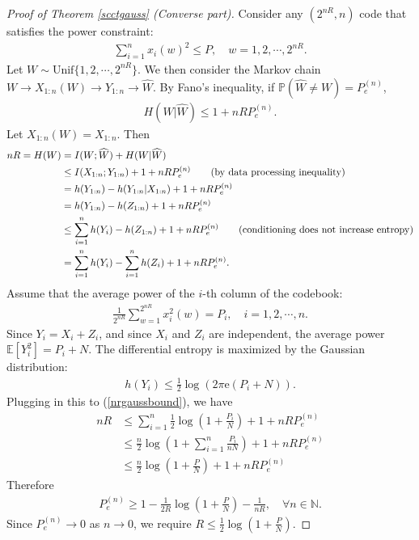 \documentclass{article}
\numberwithin{equation}{section}
\newcommand{\e}{\mathrm{e}}
\newcommand{\E}{\mathbb{E}}
\newcommand{\bbN}{\mathbb{N}}
\newcommand{\bbP}{\mathbb{P}}
\newcommand{\wh}{\widehat}
\theoremstyle{plain}
\theoremstyle{definition}
\begin{document}
\begin{proof}[Proof of Theorem \ref{scctgauss} (Converse part)]
Consider any $(2^{nR},n)$ code that satisfies the power constraint:
\begin{align*}
	\sum_{i=1}^n x_i(w)^2\leq P,\quad w=1,2,\cdots,2^{nR}.
\end{align*}
Let $W\sim\mathrm{Unif}\{1,2,\cdots,2^{nR}\}$. We then consider the Markov chain $W\to X_{1:n}(W)\to Y_{1:n}\to\wh{W}$. By Fano's inequality, if $\bbP(\wh{W}\neq W)=P_e^{(n)}$,
\begin{align*}
	H(W|\wh{W})\leq 1+nRP_e^{(n)}.
\end{align*}
Let $X_{1:n}(W)=X_{1:n}$. Then
\begin{align}
	nR=H(W)&=I(W;\wh{W})+H(W|\wh{W})\notag\\
	&\leq I(X_{1:n};Y_{1:n})+1+nRP_e^{(n)}\tag{by data processing inequality}\\
	&= h(Y_{1:n})-h(Y_{1:n}|X_{1:n})+1+nRP_e^{(n)}\notag\\
	&=h(Y_{1:n})-h(Z_{1:n})+1+nRP_e^{(n)}\notag\\
	&\leq\sum_{i=1}^n h(Y_i)-h(Z_{1:n})+1+nRP_e^{(n)}\tag{conditioning does not increase entropy}\\
	&=\sum_{i=1}^n h(Y_i)-\sum_{i=1}^n h(Z_i)+1+nRP_e^{(n)}.\label{nrgaussbound}
\end{align}
Assume that the average power of the $i$-th column of the codebook:
\begin{align*}
	\frac{1}{2^{nR}}\sum_{w=1}^{2^{nR}}x_i^2(w)=P_i,\quad i=1,2,\cdots,n.
\end{align*}
Since $Y_i=X_i+Z_i$, and since $X_i$ and $Z_i$ are independent, the average power $\E[Y_i^2]=P_i+N$. The differential entropy is maximized by the Gaussian distribution:
\begin{align*}
	h(Y_i)\leq\frac{1}{2}\log(2\pi\e(P_i+N)).
\end{align*}
Plugging in this to (\ref{nrgaussbound}), we have
\begin{align*}
nR&\leq\sum_{i=1}^n\frac{1}{2}\log\left(1+\frac{P_i}{N}\right)+1+nRP_e^{(n)}\\
&\leq\frac{n}{2}\log\left(1+\sum_{i=1}^n\frac{P_i}{nN}\right)+1+nRP_e^{(n)}\tag{by Jensen's inequality}\\
&\leq\frac{n}{2}\log\left(1+\frac{P}{N}\right)+1+nRP_e^{(n)}
\end{align*}
Therefore
\begin{align*}
	P_e^{(n)}\geq 1-\frac{1}{2R}\log\left(1+\frac{P}{N}\right)-\frac{1}{nR},\quad\forall n\in\bbN.
\end{align*}
Since $P_e^{(n)}\to 0$ as $n\to 0$, we require $R\leq\frac{1}{2}\log\left(1+\frac{P}{N}\right)$.
\end{proof}
\end{document}
